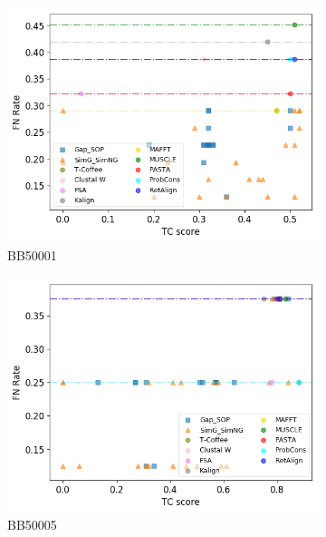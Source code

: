 \begin{figure}[!htbp]
	\begin{adjustwidth}{-1cm}{-1cm}
		\centering
		\begin{subfigure}{0.22\textwidth}
			\includegraphics[width=\columnwidth]{Figure/summary/precomputedInit/Balibase/BB50001_fnrate_vs_tc_2}
			\caption{BB50001}
		\end{subfigure}	
		\begin{subfigure}{0.22\textwidth}
			\includegraphics[width=\columnwidth]{Figure/summary/precomputedInit/Balibase/BB50005_fnrate_vs_tc_2}
			\caption{BB50005}
		\end{subfigure}
		\begin{subfigure}{0.22\textwidth}

\end{subfigure}
\end{adjustwidth}
\end{figure}
